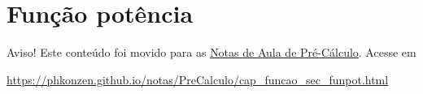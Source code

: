 




\section{Função potência}\label{cap_funcao_sec_funpot}

\begin{center}
  Aviso! Este conteúdo foi movido para as \href{https://phkonzen.github.io/notas/PreCalculo/main.html}{Notas de Aula de Pré-Cálculo}. Acesse em

  \url{https://phkonzen.github.io/notas/PreCalculo/cap_funcao_sec_funpot.html}
\end{center}


